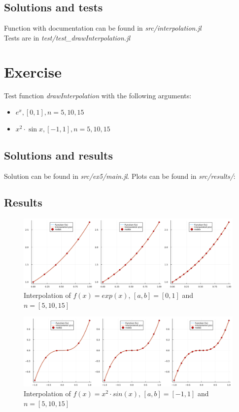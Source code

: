 \documentclass[11pt]{article}
\begin{document}
\subsection*{Solutions and tests}
Function with documentation can be found in \textit{src/interpolation.jl}\\
Tests are in \textit{test/test\_drawInterpolation.jl}
\section{Exercise}
Test function \textit{drawInterpolation} with the following arguments:
\begin{itemize}
    \item $e^x, [0, 1], n=5,10,15$
    \item $x^2 \cdot \sin x, [-1, 1], n=5,10,15$
\end{itemize}
\subsection*{Solutions and results}
Solution can be found in \textit{src/ex5/main.jl}. Plots can be found in \textit{src/results/}:
\subsection*{Results} 
\begin{figure}[h]
    \centering
    \includegraphics[width=1\textwidth]{ex5_plot1.png}
    \caption{Interpolation of $f(x)=exp(x)$, $[a,b] = [0,1]$ and $n = [5,10,15]$}
\end{figure}
\begin{figure}[h]
    \centering
    \includegraphics[width=1\textwidth]{ex5_plot2.png}
    \caption{Interpolation of $f(x)=x^2 \cdot sin(x)$, $[a,b] = [-1,1]$ and $n = [5,10,15]$}
\end{figure}
\end{document}
